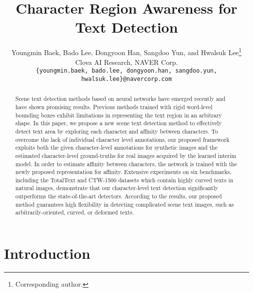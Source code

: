 \documentclass[10pt,twocolumn,letterpaper]{article}
\begin{document}
\title{Character Region Awareness for Text Detection}


\author{
 Youngmin Baek, Bado Lee, Dongyoon Han, Sangdoo Yun, and Hwalsuk Lee\thanks{Corresponding author.}\\
 Clova AI Research, NAVER Corp.\\
 {\tt\small\{youngmin.baek, bado.lee, dongyoon.han, sangdoo.yun, hwalsuk.lee\}@navercorp.com} \\
}

\maketitle

\begin{abstract}
Scene text detection methods based on neural networks have emerged recently and have shown promising results. Previous methods trained with rigid word-level bounding boxes exhibit limitations in representing the text region in an arbitrary shape. In this paper, we propose a new scene text detection method to effectively detect text area by exploring each character and affinity between characters. To overcome the lack of individual character level annotations, our proposed framework exploits both the given character-level annotations for synthetic images and the estimated character-level ground-truths for real images acquired by the learned interim model. In order to estimate affinity between characters, the network is trained with the newly proposed representation for affinity. Extensive experiments on six benchmarks, including the TotalText and CTW-1500 datasets which contain highly curved texts in natural images, demonstrate that our character-level text detection significantly outperforms the state-of-the-art detectors. According to the results, our proposed method guarantees high flexibility in detecting complicated scene text images, such as arbitrarily-oriented, curved, or deformed texts.
\end{abstract}

 \section{Introduction}
\end{document}
